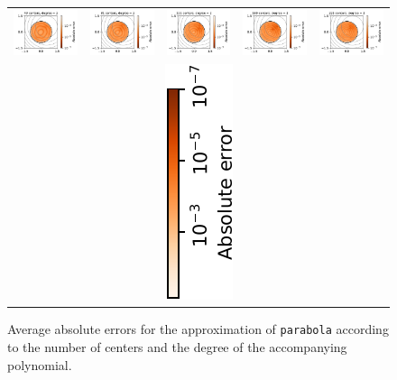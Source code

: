 \documentclass[12pt]{report} %
\begin{document}
\begin{figure}
\begin{tabular}{ccccc}
    {\includegraphics[width=.2\textwidth, clip=true,trim={0 0 2.1cm 0}]{imagenes/experiments/2d/statistical_2d_full_scheduler_interpolation/parabola/parabola_49_2.pdf}} & {\includegraphics[width=.2\textwidth, clip=true,trim={0 0 2.1cm 0}]{imagenes/experiments/2d/statistical_2d_full_scheduler_interpolation/parabola/parabola_81_2.pdf}} & {\includegraphics[width=.2\textwidth, clip=true,trim={0 0 2.1cm 0}]{imagenes/experiments/2d/statistical_2d_full_scheduler_interpolation/parabola/parabola_121_2.pdf}} & {\includegraphics[width=.2\textwidth, clip=true,trim={0 0 2.1cm 0}]{imagenes/experiments/2d/statistical_2d_full_scheduler_interpolation/parabola/parabola_169_2.pdf}} & {\includegraphics[width=.2\textwidth, clip=true,trim={0 0 2.1cm 0}]{imagenes/experiments/2d/statistical_2d_full_scheduler_interpolation/parabola/parabola_225_2.pdf}} \\
    \multicolumn{5}{c}{\includegraphics[width=.05\textwidth,angle=270,origin=c]{imagenes/experiments/2d/statistical_2d_full_scheduler_interpolation/parabola/colorbar_parabola.pdf}}
  \end{tabular}
  \caption{Average absolute errors for the approximation of \texttt{parabola} according to the number of centers and the degree of the accompanying polynomial.}
  \label{fig:parabola-results-average-errors}
\end{figure}
\end{document}
